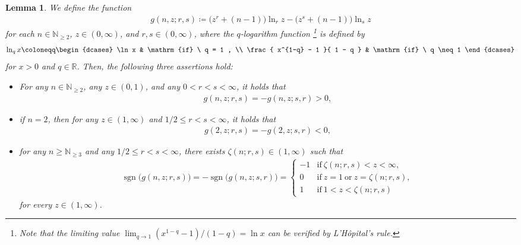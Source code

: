 \documentclass[conference, draftcls, onecolumn]{IEEEtran}
\theoremstyle{plain}
\newtheorem{lemma}{Lemma}
\newcommand{\sgn}{\operatorname{sgn}}
\begin{document}
\begin{lemma}
\label{lem:sgn_g}
We define the function
\begin{align}
g(n, z; r, s)
\coloneqq
\big( z^{r} + (n-1) \big) \ln_{r} z - \big( z^{s} + (n-1) \big) \ln_{s} z
\label{def:g}
\end{align}
for each $n \in \mathbb{N}_{\ge 2}$, $z \in (0, \infty)$, and $r, s \in (0, \infty)$, where
the $q$-logarithm function%
\footnote{Note that the limiting value $\lim_{q \to 1} (x^{1-q} - 1)/(1-q) = \ln x$ can be verified by L'H\^{o}pital's rule.}
\cite{tsallis}
is defined by
\begin{align}
\ln_{q} x
\coloneqq
\begin{dcases}
\ln x
& \mathrm{if} \ q = 1 ,
\\
\frac{ x^{1-q} - 1 }{ 1 - q }
& \mathrm{if} \ q \neq 1
\end{dcases}
\label{def:qlog}
\end{align}
for $x > 0$ and $q \in \mathbb{R}$.
Then, the following three assertions hold:
\begin{itemize}
\item
For any $n \in \mathbb{N}_{\ge 2}$, any $z \in (0, 1)$, and any $0 < r < s < \infty$, it holds that
\begin{align}
g(n, z; r, s)
=
- g(n, z; s, r)
>
0 ,
\label{eq:sgn_g_1}
\end{align}
\item
if $n = 2$, then for any $z \in (1, \infty)$ and $1/2 \le r < s < \infty$, it holds that
\begin{align}
g(2, z; r, s)
=
- g(2, z; s, r)
<
0 ,
\label{eq:sgn_g_2}
\end{align}
\item
for any $n \ge \mathbb{N}_{\ge 3}$ and any $1/2 \le r < s < \infty$, there exists $\zeta(n; r, s) \in (1, \infty)$ such that
\begin{align}
\sgn\Big( g(n, z; r, s) \Big)
=
- \sgn\Big( g(n, z; s, r) \Big)
=
\begin{cases}
-1
& \mathrm{if} \ \zeta(n; r, s) < z < \infty ,
\\
0
& \mathrm{if} \ z = 1 \ \mathrm{or} \ z = \zeta(n; r, s) ,
\\
1
& \mathrm{if} \ 1 < z < \zeta(n; r, s)
\end{cases}
\label{eq:sgn_g_3}
\end{align}
for every $z \in (1, \infty)$.
\end{itemize}
\end{lemma}
\end{document}
